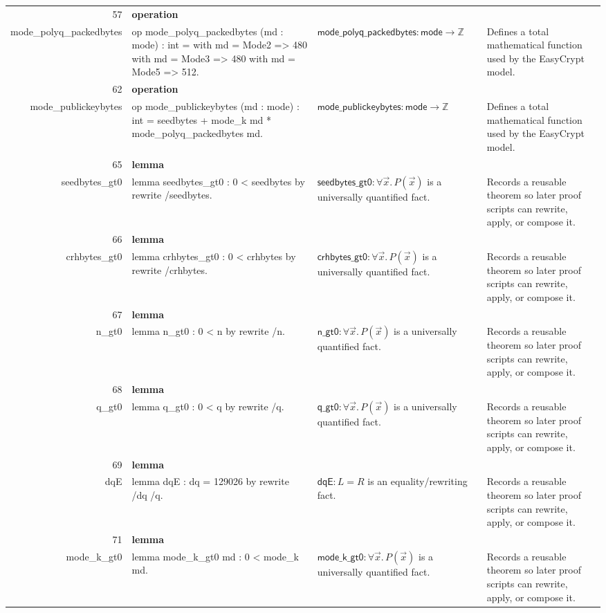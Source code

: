 \documentclass[10pt]{article}
\newcommand{\ec}[1]{\begingroup\ttfamily\scriptsize #1\endgroup}
\begin{document}
\begin{longtable}{r L{0.17\textwidth} L{0.26\textwidth} L{0.27\textwidth} L{0.20\textwidth}}
57 & \textbf{operation}\\\ec{mode\_polyq\_packedbytes} & \ec{op mode\_polyq\_packedbytes (md : mode) : int = with md = Mode2 => 480 with md = Mode3 => 480 with md = Mode5 => 512.} & \(\mathsf{mode\_polyq\_packedbytes} : \mathsf{mode} \to \mathbb{Z}\) & Defines a total mathematical function used by the EasyCrypt model. \\
62 & \textbf{operation}\\\ec{mode\_publickeybytes} & \ec{op mode\_publickeybytes (md : mode) : int = seedbytes + mode\_k md * mode\_polyq\_packedbytes md.} & \(\mathsf{mode\_publickeybytes} : \mathsf{mode} \to \mathbb{Z}\) & Defines a total mathematical function used by the EasyCrypt model. \\
65 & \textbf{lemma}\\\ec{seedbytes\_gt0} & \ec{lemma seedbytes\_gt0 : 0 < seedbytes by rewrite /seedbytes.} & \(\mathsf{seedbytes\_gt0} : \forall \vec{x}.\, P(\vec{x})\) is a universally quantified fact. & Records a reusable theorem so later proof scripts can rewrite, apply, or compose it. \\
66 & \textbf{lemma}\\\ec{crhbytes\_gt0} & \ec{lemma crhbytes\_gt0 : 0 < crhbytes by rewrite /crhbytes.} & \(\mathsf{crhbytes\_gt0} : \forall \vec{x}.\, P(\vec{x})\) is a universally quantified fact. & Records a reusable theorem so later proof scripts can rewrite, apply, or compose it. \\
67 & \textbf{lemma}\\\ec{n\_gt0} & \ec{lemma n\_gt0 : 0 < n by rewrite /n.} & \(\mathsf{n\_gt0} : \forall \vec{x}.\, P(\vec{x})\) is a universally quantified fact. & Records a reusable theorem so later proof scripts can rewrite, apply, or compose it. \\
68 & \textbf{lemma}\\\ec{q\_gt0} & \ec{lemma q\_gt0 : 0 < q by rewrite /q.} & \(\mathsf{q\_gt0} : \forall \vec{x}.\, P(\vec{x})\) is a universally quantified fact. & Records a reusable theorem so later proof scripts can rewrite, apply, or compose it. \\
69 & \textbf{lemma}\\\ec{dqE} & \ec{lemma dqE : dq = 129026 by rewrite /dq /q.} & \(\mathsf{dqE} : L = R\) is an equality/rewriting fact. & Records a reusable theorem so later proof scripts can rewrite, apply, or compose it. \\
71 & \textbf{lemma}\\\ec{mode\_k\_gt0} & \ec{lemma mode\_k\_gt0 md : 0 < mode\_k md.} & \(\mathsf{mode\_k\_gt0} : \forall \vec{x}.\, P(\vec{x})\) is a universally quantified fact. & Records a reusable theorem so later proof scripts can rewrite, apply, or compose it. \\

\end{longtable}
\end{document}
